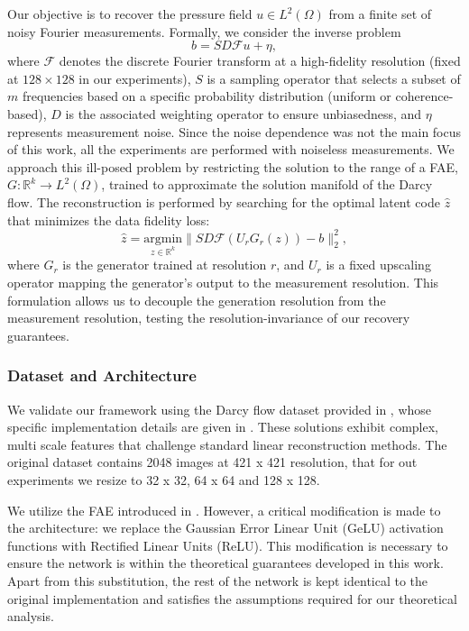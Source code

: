 \documentclass[a4paper,oneside]{amsart}
\begin{document}
Our objective is to recover the pressure field $u \in L^2(\Omega)$ from a finite set of noisy Fourier measurements. Formally, we consider the inverse problem
$$b = S D \mathcal{F} u + \eta,$$
where $\mathcal{F}$ denotes the discrete Fourier transform at a high-fidelity resolution (fixed at $128 \times 128$ in our experiments), $S$ is a sampling operator that selects a subset of $m$ frequencies based on a specific probability distribution (uniform or coherence-based), $D$ is the associated weighting operator to ensure unbiasedness, and $\eta$ represents measurement noise. Since the noise dependence was not the main focus of this work, all the experiments are performed with noiseless measurements. We approach this ill-posed problem by restricting the solution to the range of a FAE, $G: \mathbb{R}^k \to L^2(\Omega)$, trained to approximate the solution manifold of the Darcy flow. The reconstruction is performed by searching for the optimal latent code $\hat{z}$ that minimizes the data fidelity loss:
$$\hat{z} = \underset{z \in \mathbb{R}^k}{\text{argmin}} \| S D \mathcal{F} (U_r G_{r}(z)) - b \|_2^2,$$
where $G_{r}$ is the generator trained at resolution $r$, and $U_r$ is a fixed upscaling operator mapping the generator's output to the measurement resolution. This formulation allows us to decouple the generation resolution from the measurement resolution, testing the resolution-invariance of our recovery guarantees.

\subsubsection{Dataset and Architecture}
We validate our framework using the Darcy flow dataset provided in \cite{darcy-dataset}, whose specific implementation details are given in \cite[Appendix A.3.2]{darcy-dataset}. These solutions exhibit complex, multi scale features that challenge standard linear reconstruction methods. The original dataset contains 2048 images at 421 x 421 resolution, that for out experiments we resize to 32 x 32, 64 x 64 and 128 x 128.

We utilize the FAE introduced in \cite{bunker2025autoencoders}. However, a critical modification is made to the architecture: we replace the Gaussian Error Linear Unit (GeLU) activation functions with Rectified Linear Units (ReLU). This modification is necessary to ensure the network is within the theoretical guarantees developed in this work. Apart from this substitution, the rest of the network is kept identical to the original implementation and satisfies the assumptions required for our theoretical analysis.
\end{document}
